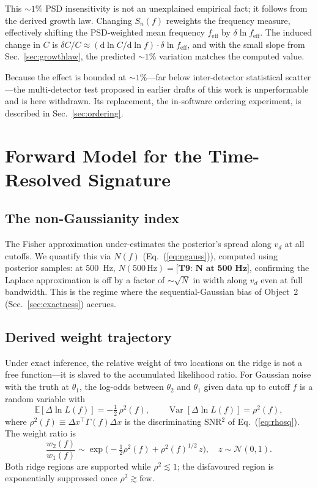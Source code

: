 \documentclass[twocolumn,prd,showpacs,superscriptaddress]{revtex4-2}
\newcommand{\Var}{\operatorname{Var}}
\newcommand{\vd}{v_{d}}          %
\newcommand{\rhosq}{\rho^{2}}    %
\newcommand{\secref}[1]{Sec.~\ref{sec:#1}}
\newcommand{\eqnref}[1]{Eq.~(\ref{eq:#1})}
\newcommand{\manifest}[1]{\textbf{[#1]}}
\begin{document}
This $\sim1\%$ PSD insensitivity is not an unexplained empirical
fact; it follows from the derived growth law.  Changing $S_n(f)$
reweights the frequency measure, effectively shifting the PSD-weighted
mean frequency $f_{\text{eff}}$ by $\delta\ln f_{\text{eff}}$.
The induced change in $C$ is
$\delta C / C \approx (\mathrm{d}\ln C / \mathrm{d}\ln f) \cdot
\delta\ln f_{\text{eff}}$, and with the small slope from
\secref{growthlaw}, the predicted $\sim1\%$ variation matches the
computed value.

Because the effect is bounded at $\sim1\%$---far below inter-detector
statistical scatter---the multi-detector test proposed in earlier
drafts of this work is unperformable and is here withdrawn.  Its
replacement, the in-software ordering experiment, is described in
\secref{ordering}.


\section{Forward Model for the Time-Resolved Signature}
\label{sec:forward}

\subsection{The non-Gaussianity index}
\label{sec:ngauss}

The Fisher approximation under-estimates the posterior's spread along
$\vd$ at all cutoffs.  We quantify this via $N(f)$
(\eqnref{ngauss}), computed using posterior samples: at 500~Hz,
$N(500\,\text{Hz}) = \manifest{T9: N at 500 Hz}$,
confirming the Laplace approximation is off by a factor of
$\sim\!\sqrt{N}$ in width along $\vd$ even at full bandwidth.
This is the regime where the sequential-Gaussian bias of Object~2
(\secref{exactness}) accrues.

\subsection{Derived weight trajectory}
\label{sec:weights}

Under exact inference, the relative weight of two locations on the
ridge is not a free function---it is slaved to the accumulated
likelihood ratio.  For Gaussian noise with the truth at $\theta_1$,
the log-odds between $\theta_2$ and $\theta_1$ given data up to
cutoff $f$ is a random variable with
\begin{equation}
\mathbb{E}[\Delta\ln L(f)] = -\tfrac12\,\rhosq(f),\qquad
\Var[\Delta\ln L(f)] = \rhosq(f),
\label{eq:logodds}
\end{equation}
where $\rhosq(f) \equiv \Delta x^{\top}\Gamma(f)\Delta x$ is the
discriminating SNR$^2$ of \eqnref{rhosq}.  The weight ratio is
\begin{equation}
\frac{w_2(f)}{w_1(f)} \sim \exp\!\bigl(-\tfrac12 \rhosq(f)
+ \rhosq(f)^{1/2}\,z\bigr),\quad z\sim\mathcal{N}(0,1).
\label{eq:weight_derived}
\end{equation}
Both ridge regions are supported while $\rhosq \lesssim 1$; the
disfavoured region is exponentially suppressed once $\rhosq \gtrsim
\text{few}$.
\end{document}
